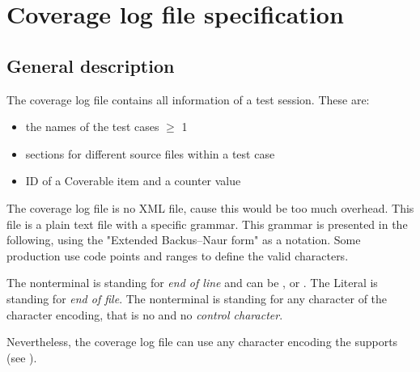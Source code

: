 \section{Coverage log file specification} \label{Coverage log file specification}
\subsection{General description}
The coverage log file contains all information of a test session. These are:
\begin{itemize}
\item the names of the test cases $\geq$ 1
\item sections for different source files within a test case
\item ID of a Coverable item and a counter value
\end{itemize}
The coverage log file is no XML file, cause this would be too much overhead. This file is a plain text file with a specific grammar. This grammar is presented in the following, using the "Extended Backus–Naur form" as a notation. Some production use  code points and ranges to define the valid characters.
\par The nonterminal  is standing for \textit{end of line} and can be ,  or . The Literal  is standing for \textit{end of file}. The nonterminal  is standing for any character of the character encoding, that is no  and no \textit{control character}.
\par Nevertheless, the coverage log file can use any character encoding the  supports (see ).

